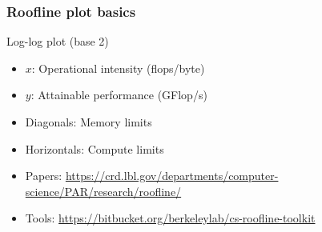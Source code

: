 \documentclass{beamer}
\begin{document}

\begin{frame}
  \frametitle{Roofline plot basics}

  Log-log plot (base 2)
  \begin{itemize}
  \item $x$: Operational intensity (flops/byte)
  \item $y$: Attainable performance (GFlop/s)
  \item Diagonals: Memory limits
  \item Horizontals: Compute limits
  \item Papers: \url{https://crd.lbl.gov/departments/computer-science/PAR/research/roofline/}
  \item Tools: \url{https://bitbucket.org/berkeleylab/cs-roofline-toolkit}
  \end{itemize}
\end{frame}
\end{document}
